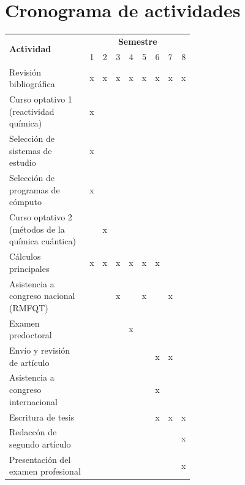 \documentclass[12pt]{article}
\begin{document}
		\clearpage
	\section{Cronograma de actividades}
	
	\begin{table}[hbp!]
		\centering
		\footnotesize
		\setlength{\tabcolsep}{8.0pt}
		\begin{tabular}{||p{0.6\linewidth}|c|c|c|c|c|c|c|c|}
			\hline
			\multirow{2}{*}{\centering\textbf{Actividad}} & \multicolumn{8}{c|}{\textbf{Semestre}}\\
			& 1 & 2 & 3 & 4 & 5 & 6 & 7 & 8\\\hline\hline
			Revisi\'{o}n bibliogr\'{a}fica & x  & x & x  & x & x  & x & x  & x\\ \hline
			Curso optativo 1 (reactividad qu\'{i}mica) & x & &&&&&&\\ \hline
			Selecci\'{o}n de sistemas de estudio & x & &&&&&&\\ \hline
			Selecci\'{o}n de programas de c\'{o}mputo & x & &&&&&&\\ \hline
			Curso optativo 2 (m\'{e}todos de la qu\'{i}mica cu\'{a}ntica) &  & x&&&&&&\\ \hline
			C\'{a}lculos principales &x&x&x&x&x&x&&\\ \hline
			Asistencia a congreso nacional (RMFQT) &&&x&&x&&x&\\ \hline
			Examen predoctoral &  & &&x&&&&\\ \hline
			Env\'{i}o y revisi\'{o}n de art\'{i}culo &  & &&&&x&x&\\ \hline
			Asistencia a congreso internacional &  & & & &&x&&\\ \hline
			Escritura de tesis & &&&&&x&x&x \\ \hline
			Redacc\'{o}n de segundo art\'{i}culo &  & &&&&&&x\\ \hline
			Presentaci\'{o}n del examen profesional & &&&&&&&x \\
			\hline
		\end{tabular}
	\end{table}
	
	
	\newpage
	
	
	   

	
\end{document}

